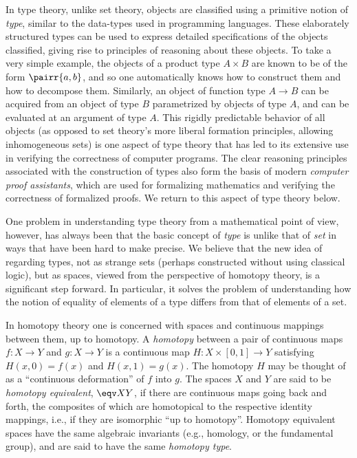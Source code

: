 In type theory, unlike set theory, objects are classified using a primitive notion of \emph{type}, similar to the data-types used in programming languages.  These elaborately structured types can be used to express detailed specifications of the objects classified, giving rise to principles of reasoning about these objects.  To take a very simple example, the objects of a product type $A\times B$ are known to be of the form $\pairr{a,b}$, and so one automatically knows how to construct them and how to decompose them. Similarly, an object of function type $A\to B$ can be acquired from an object of type $B$ parametrized by objects of type $A$, and can be evaluated at an argument of type $A$.  This rigidly predictable behavior of all objects (as opposed to set theory's more liberal formation principles, allowing inhomogeneous sets) is one aspect of type theory that has led to its extensive use in verifying the correctness of computer programs.  The clear reasoning principles associated with the construction of types also form the basis of modern \emph{computer proof assistants},%
%
%
which are used for formalizing mathematics and verifying the correctness of formalized proofs.  We return to this aspect of type theory below.  

One problem in understanding type theory from a mathematical point of view, however, has always been that the basic concept of \emph{type} is unlike that of \emph{set} in ways that have been hard to make precise.  We believe that the new idea of regarding types, not as strange sets (perhaps constructed without using classical logic), but as spaces, viewed from the perspective of homotopy theory, is a significant step forward.  In particular, it solves the problem of understanding how the notion of equality of elements of a type differs from that of elements of a set.

In homotopy theory one is concerned with spaces
%
and continuous mappings between them, 
%
up to homotopy.  A \emph{homotopy}
%
between a pair of continuous maps $f : X \to Y$
and  $g : X\to Y$ is 
a continuous map $H : X \times [0, 1] \to Y$ satisfying
$H(x, 0) = f (x)$  and $H(x, 1) = g(x)$. The homotopy $H$ may be thought of as a ``continuous deformation'' of $f$ into $g$. The spaces $X$ and $Y$ are said to be \emph{homotopy equivalent},
%
$\eqv X Y$, if there are continuous maps going back and forth, the composites of which are homotopical to the respective identity mappings, i.e., if they are isomorphic ``up to homotopy''.  Homotopy equivalent spaces have the same algebraic invariants (e.g., homology, or the fundamental group), and are said to have the same \emph{homotopy type}.

